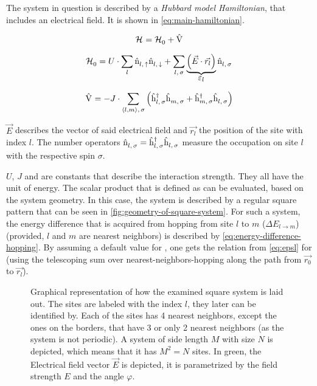 The system in question is described by a \emph{Hubbard model Hamiltonian}, that includes an electrical field. It is shown in \autoref{eq:main-hamiltonian}.


\begin{equation}
    \label{eq:main-hamiltonian}
    \pictureHamiltonian = \HzeroHamiltonian + \Vhamiltonian
\end{equation}

\begin{equation}
    \label{eq:main-hamiltonian-h0}
    \HzeroHamiltonian = U \cdot \lsum \nop{l}{\up}\nop{l}{\down} + \lsum[l,\,\sigma] \underbrace{\left(\vec{E} \cdot \vec{r_l}\right)}_{\text{\normalsize \epsl}} \nop{l}{\sigma}
\end{equation}

\begin{equation}
    \label{eq:main-hamiltonian-perturbation}
    \Vhamiltonian =  - J \cdot \neighborsumWSpin{l}{m}{\sigma} \left(\withspinhcop{l}{\sigma}{\dagger} \withspinhcop{m}{\sigma}{} + \withspinhcop{m}{\sigma}{\dagger} \withspinhcop{l}{\sigma}{} \right)
\end{equation}

$\vec{E}$ describes the vector of said electrical field and $\vec{r_l}$ the position of the site with index $l$.
The number operators $\hat{\text{n}}^{ }_{l,\,\sigma} = \hat{\text{h}}^{\dagger }_{l,\,\sigma}\hat{\text{h}}^{ }_{l,\,\sigma}$ measure the occupation on site $l$ with the respective spin $\sigma$. 

$U$, $J$ and \epsl[] are constants that describe the interaction strength. 
They all have the unit of energy. 
The scalar product that is defined as \epsl[] can be evaluated, based on the system geometry. 
In this case, the system is described by a regular square pattern that can be seen in \autoref{fig:geometry-of-square-system}. 
For such a system, the energy difference that is acquired from hopping from site $l$ to $m$ ($\Delta E_{l \rightarrow m}$) (provided, $l$ and $m$ are nearest neighbors) is described by \autoref{eq:energy-difference-hopping}. By assuming a default value for \epsl[0], one gets the relation from \autoref{eq:epsl} for \epsl{} (using the telescoping sum over nearest-neighbors-hopping along the path from $\vec{r_0}$ to $\vec{r_l}$). 

\begin{figure}[htbp]
    \centering
            
    \vspace{0.8cm}
    \caption{Graphical representation of how the examined square system is laid out. The sites are labeled with the index $l$, they later can be identified by. Each of the sites has 4 nearest neighbors, except the ones on the borders, that have 3 or only 2 nearest neighbors (as the system is not periodic). A system of side length $M$ with size $N$ is depicted, which means that it has $M^2 = N$ sites.
    In green, the Electrical field vector $\vec{E}$ is depicted, it is parametrized by the field strength $E$ and the angle $\varphi$.}
    \label{fig:geometry-of-square-system}
\end{figure}

